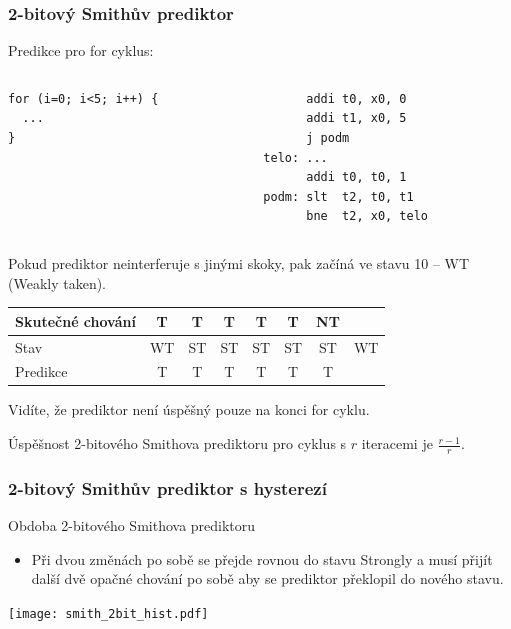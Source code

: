 \documentclass{beamer}
\begin{document}
\begin{frame}[fragile]
\frametitle{2-bitový Smithův prediktor}

Predikce pro for cyklus:

\begin{columns}[T]
\begin{column}{0.35\textwidth}
\begin{verbatim}
for (i=0; i<5; i++) {
  ...
}
\end{verbatim}
\end{column}
\hfill
\begin{column}{0.45\textwidth}
\begin{verbatim}
      addi t0, x0, 0
      addi t1, x0, 5
      j podm
telo: ...
      addi t0, t0, 1
podm: slt  t2, t0, t1
      bne  t2, x0, telo
\end{verbatim}
\end{column}
\end{columns}
\bigskip
\small
Pokud prediktor neinterferuje s jinými skoky, pak začíná ve stavu 10 -- WT (Weakly taken).

\begin{tabular}{|l|c|c|c|c|c|c|c|}\hline
Skutečné chování & T & T & T & T & T & NT &\\ \hline
Stav & WT & ST & ST & ST & ST & ST & WT\\ \hline
Predikce         & T & T & T & T & T & {\color{red}T} &\\ \hline
\end{tabular}

Vidíte, že prediktor není úspěšný pouze na konci for cyklu.

Úspěšnost 2-bitového Smithova prediktoru pro cyklus s $r$ iteracemi je $\frac{r-1}{r}$.
\end{frame}


\begin{frame}
\frametitle{2-bitový Smithův prediktor s hysterezí}

Obdoba 2-bitového Smithova prediktoru
\begin{itemize}
\item Při dvou změnách po sobě se přejde rovnou do stavu Strongly a musí přijít další dvě opačné chování po sobě aby se prediktor překlopil do nového stavu.
\end{itemize}

\begin{center}
\texttt{[image: smith\_2bit\_hist.pdf]}
\end{center}
\end{frame}
\end{document}
